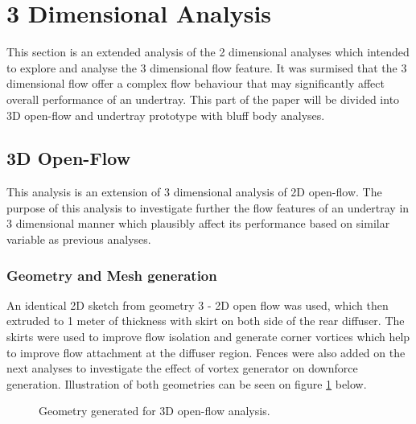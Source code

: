 \section{3 Dimensional Analysis}
\noindent This section is an extended analysis of the 2 dimensional analyses which intended to explore and analyse the 3 dimensional flow feature. It was surmised that the 3 dimensional flow offer a complex flow behaviour that may significantly affect overall performance of an undertray. This part of the paper will be divided into 3D open-flow and undertray prototype with bluff body analyses.


\subsection{3D Open-Flow}
This analysis is an extension of 3 dimensional analysis of 2D open-flow. The purpose of this analysis to investigate further the flow features of an undertray in 3 dimensional manner which plausibly affect its performance based on similar variable as previous analyses.

\subsubsection{Geometry and Mesh generation}
An identical 2D sketch from geometry 3 - 2D open flow was used, which then extruded to 1 meter of thickness with skirt on both side of the rear diffuser. The skirts were used to improve flow isolation  and generate corner vortices which help to improve flow attachment at the diffuser region. Fences were also added on the next analyses to investigate the effect of vortex generator on downforce generation. Illustration of both geometries can be seen on figure \ref{fig:3D_OF_GEOM} below.  

\begin{figure}[!h]
    \centering
    \noindent{}
    \caption{Geometry generated for 3D open-flow analysis.}
    \label{fig:3D_OF_GEOM}
\end{figure}

